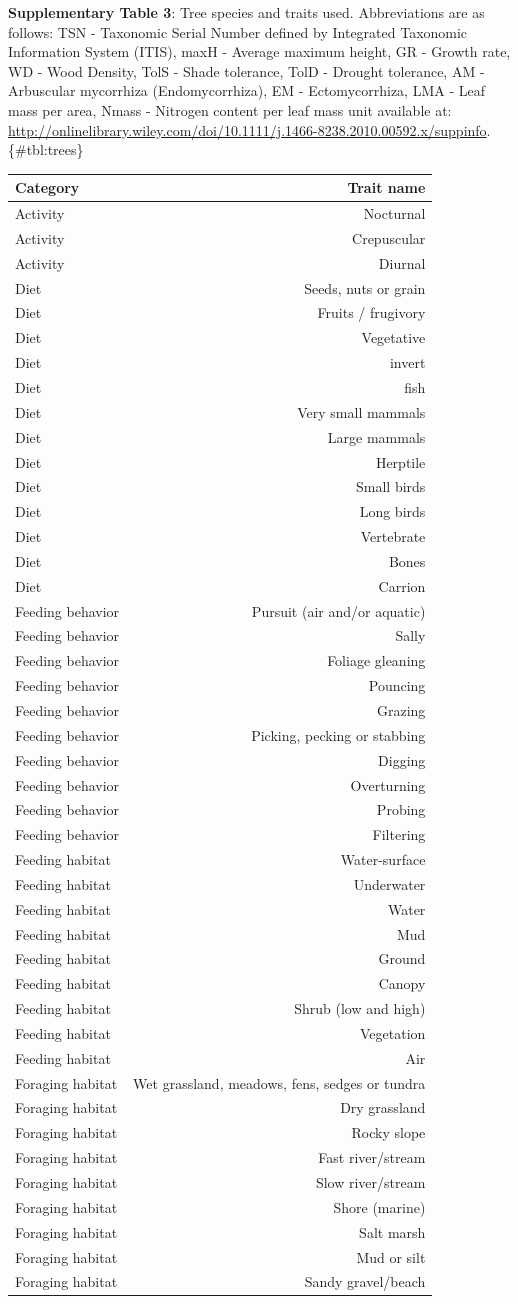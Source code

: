 \textbf{Supplementary Table 3}: Tree species and traits used.
Abbreviations are as follows: TSN - Taxonomic Serial Number defined by
Integrated Taxonomic Information System (ITIS), maxH - Average maximum
height, GR - Growth rate, WD - Wood Density, TolS - Shade tolerance,
TolD - Drought tolerance, AM - Arbuscular mycorrhiza (Endomycorrhiza),
EM - Ectomycorrhiza, LMA - Leaf mass per area, Nmass - Nitrogen content
per leaf mass unit\citep{Paquette2011} available at:
\url{http://onlinelibrary.wiley.com/doi/10.1111/j.1466-8238.2010.00592.x/suppinfo}.\{\#tbl:trees\}

\begin{longtable}[]{@{}lr@{}}
\toprule
Category & Trait name\tabularnewline
\midrule
\endhead
Activity & Nocturnal\tabularnewline
Activity & Crepuscular\tabularnewline
Activity & Diurnal\tabularnewline
Diet & Seeds, nuts or grain\tabularnewline
Diet & Fruits / frugivory\tabularnewline
Diet & Vegetative\tabularnewline
Diet & invert\tabularnewline
Diet & fish\tabularnewline
Diet & Very small mammals\tabularnewline
Diet & Large mammals\tabularnewline
Diet & Herptile\tabularnewline
Diet & Small birds\tabularnewline
Diet & Long birds\tabularnewline
Diet & Vertebrate\tabularnewline
Diet & Bones\tabularnewline
Diet & Carrion\tabularnewline
Feeding behavior & Pursuit (air and/or aquatic)\tabularnewline
Feeding behavior & Sally\tabularnewline
Feeding behavior & Foliage gleaning\tabularnewline
Feeding behavior & Pouncing\tabularnewline
Feeding behavior & Grazing\tabularnewline
Feeding behavior & Picking, pecking or stabbing\tabularnewline
Feeding behavior & Digging\tabularnewline
Feeding behavior & Overturning\tabularnewline
Feeding behavior & Probing\tabularnewline
Feeding behavior & Filtering\tabularnewline
Feeding habitat & Water-surface\tabularnewline
Feeding habitat & Underwater\tabularnewline
Feeding habitat & Water\tabularnewline
Feeding habitat & Mud\tabularnewline
Feeding habitat & Ground\tabularnewline
Feeding habitat & Canopy\tabularnewline
Feeding habitat & Shrub (low and high)\tabularnewline
Feeding habitat & Vegetation\tabularnewline
Feeding habitat & Air\tabularnewline
Foraging habitat & Wet grassland, meadows, fens, sedges or
tundra\tabularnewline
Foraging habitat & Dry grassland\tabularnewline
Foraging habitat & Rocky slope\tabularnewline
Foraging habitat & Fast river/stream\tabularnewline
Foraging habitat & Slow river/stream\tabularnewline
Foraging habitat & Shore (marine)\tabularnewline
Foraging habitat & Salt marsh\tabularnewline
Foraging habitat & Mud or silt\tabularnewline
Foraging habitat & Sandy gravel/beach\tabularnewline

\end{longtable}
